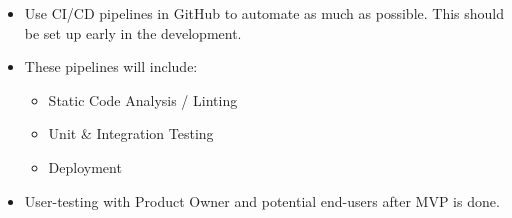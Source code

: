 \begin{itemize}
    \item Use CI/CD pipelines in GitHub to automate as much as possible. This should be set up early in the development.
    \item These pipelines will include:
    \begin{itemize}
        \item Static Code Analysis / Linting
        \item Unit \& Integration Testing
        \item Deployment
    \end{itemize}
    \item User-testing with Product Owner and potential end-users after MVP is done.
\end{itemize}

\begin{comment}
    - GitOps som et sentralt konsept
    - Bruke CI/CD Pipelines i GitHubfor å automatisere så mye som mulig
    f.eks. statiske kodesjekker og inspections, unittester og integrasjonstester, også deployment for å kunne ha manuelle inspeksjoner og tester during development.
    - Linting for Go (eks. golangci-lint).
    - Plan om usertesting etter vi har MVP på plass midt i mars, jobbe utifra kravspesifikasjon og tilbakemelding fra productowner fram til det.
    
\end{comment}

